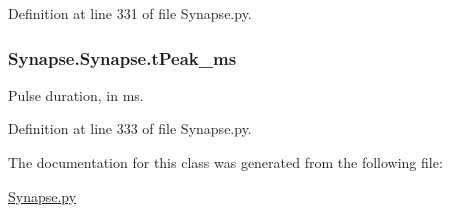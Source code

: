 Definition at line 331 of file Synapse.\+py.

\subsubsection[{\texorpdfstring{t\+Peak\+\_\+ms}{tPeak_ms}}]{\setlength{\rightskip}{0pt plus 5cm}Synapse.\+Synapse.\+t\+Peak\+\_\+ms}\hypertarget{class_synapse_1_1_synapse_a09b9b092efcb0d6745fa32fadcd46375}{}\label{class_synapse_1_1_synapse_a09b9b092efcb0d6745fa32fadcd46375}


Pulse duration, in ms. 



Definition at line 333 of file Synapse.\+py.



The documentation for this class was generated from the following file\+:\begin{DoxyCompactItemize}
\item 
\hyperlink{_synapse_8py}{Synapse.\+py}\end{DoxyCompactItemize}
